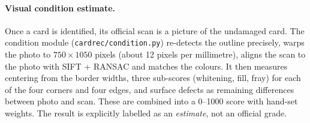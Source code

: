 \paragraph{Visual condition estimate.} Once a card is identified, its official scan is a picture of the undamaged card. The condition module (\texttt{cardrec/condition.py}) re-detects the outline precisely, warps the photo to $750\times1050$ pixels (about 12 pixels per millimetre), aligns the scan to the photo with SIFT + RANSAC and matches the colours. It then measures centering from the border widths, three sub-scores (whitening, fill, fray) for each of the four corners and four edges, and surface defects as remaining differences between photo and scan. These are combined into a 0--1000 score with hand-set weights. The result is explicitly labelled as an \emph{estimate}, not an official grade.

